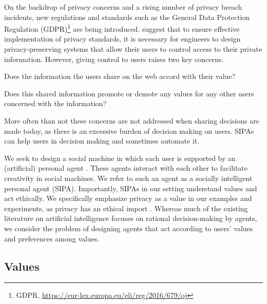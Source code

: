 On the backdrop of privacy concerns and a rising number of privacy breach incidents, new regulations and standards such as the General Data Protection Regulation (GDPR)\footnote{GDPR, \url{https://eur-lex.europa.eu/eli/reg/2016/679/oj}} are being introduced. 
\citet{spiekermann2009enggprivacy} suggest that to ensure effective implementation of privacy standards, it is necessary for engineers to design privacy-preserving systems that allow their users to control access to their private information. 
However, giving control to users raises two key concerns. 
\begin{enuminline} 
\item Does the information the users share on the web accord with their value? 
\item Does this shared information promote or demote any values for any other users concerned with the information? 
\end{enuminline}
More often than not these concerns are not addressed when sharing decisions are made today, as there is an excessive burden of decision making on users. SIPAs can help users in decision making and sometimes automate it. 

We seek to design a social machine in which each user is supported by an (artificial) personal agent \citep{Murukannaiah-AAMAS14-Xipho}. These agents interact with each other to facilitate creativity in social machines. We refer to such an agent as a socially intelligent personal agent (SIPA). Importantly, SIPAs in our setting understand values and act ethically. We specifically emphasize privacy as a value in our examples and experiments, as privacy has an ethical import \citep{Friedman-2008-value-sensitive-design}. Whereas much of the existing literature on artificial intelligence focuses on rational decision-making by agents, we consider the problem of designing agents that act according to users' values and preferences among values.

\subsection{Values}

